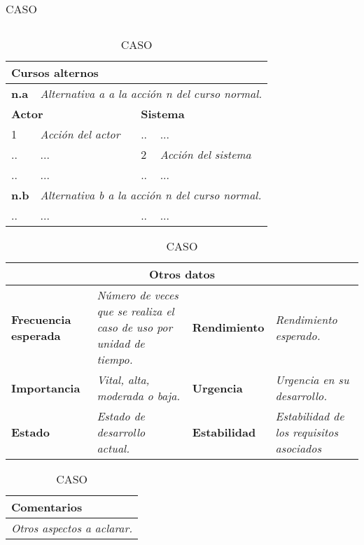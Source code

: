 \begin{table}[H]
\begin{tabular}{|m{5pt}|m{7.33cm}|m{5pt}|m{7.33cm}|}
\end{tabular}

\vspace{0.5cm}

\begin{tabular}{|m{15pt}|m{7.15cm}|m{6pt}|m{7.15cm}|}
\hline
\multicolumn{4}{|m{16.2cm}|}{\textbf{Cursos alternos}} \\
\hline
\textbf{n.a} & \multicolumn{3}{l|}{\textit{Alternativa \emph{a} a la acción n del curso normal.}}  \\
\hline
\multicolumn{2}{|m{7.2cm}}{\textbf{Actor}} & \multicolumn{2}{|m{7.2cm}|}{\textbf{Sistema}} \\
\hline
1 & \textit{Acción del actor} & .. & ... \\
\hline
.. & ... & 2 & \textit{Acción del sistema} \\
\hline
.. & ... & .. & ... \\
\hline
\textbf{n.b} & \multicolumn{3}{l|}{\textit{Alternativa \emph{b} a la acción n del curso normal.}}  \\
\hline
.. & ... & .. & ... \\
\hline
\end{tabular}

\vspace{0.5cm}

\begin{tabular}{|m{3.75cm}|m{3.75cm}|m{3.75cm}|m{3.8cm}|}
\hline
\multicolumn{4}{|c|}{\textbf{Otros datos}} \\
\hline
\textbf{Frecuencia esperada} & \textit{Número de veces que se realiza el caso de uso por unidad de tiempo.} & \textbf{Rendimiento} & \textit{Rendimiento esperado.} \\
\hline
\textbf{Importancia} & \textit{Vital, alta, moderada o baja.} & \textbf{Urgencia} & \textit{Urgencia en su desarrollo.} \\
\hline
\textbf{Estado} & \textit{Estado de desarrollo actual.} & \textbf{Estabilidad} & \textit{Estabilidad de los requisitos asociados} \\
\hline
\end{tabular}

\vspace{1cm}

\begin{tabular}{|m{16.2cm}|}
\hline
\textbf{Comentarios} \\
\hline
\textit{Otros aspectos a aclarar.} \\
\hline
\end{tabular}

\caption{CASO}

\end{table}